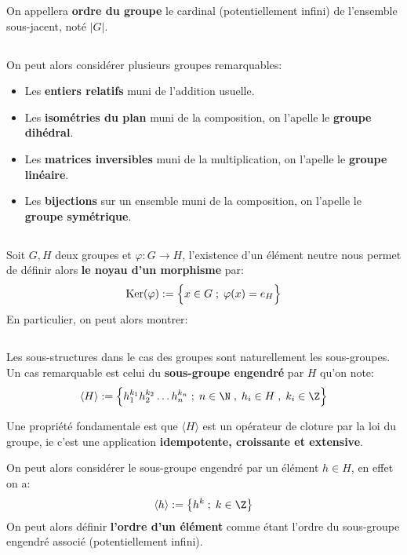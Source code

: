 On appellera \textbf{ordre du groupe} le cardinal (potentiellement infini) de l'ensemble sous-jacent, noté \(|G|\).
\subsection*{}
On peut alors considérer plusieurs groupes remarquables:
\begin{itemize}
   \item Les \textbf{entiers relatifs} muni de l'addition usuelle.
   \item Les \textbf{isométries du plan} muni de la composition, on l'apelle le \textbf{groupe dihédral}.  
   \item Les \textbf{matrices inversibles} muni de la multiplication, on l'apelle le \textbf{groupe linéaire}.
   \item Les \textbf{bijections} sur un ensemble muni de la composition, on l'apelle le \textbf{groupe symétrique}.
\end{itemize}
\subsection*{}
Soit \(G, H\) deux groupes et \(\varphi: G \rightarrow H\), l'existence d'un élément neutre nous permet de définir alors \textbf{le noyau d'un morphisme} par:
\[
   \text{Ker}(\varphi) := \Bigl\{ x \in G \; ; \; \varphi(x) = e_H \Bigl\}
\]
En particulier, on peut alors montrer:
\subsection*{}
Les sous-structures dans le cas des groupes sont naturellement les sous-groupes. Un cas remarquable est celui du \textbf{sous-groupe engendré} par \(H\) qu'on note:
\[ 
   \langle H \rangle := \Bigl\{ h_1^{k_1}h_2^{k_2} \ldots h_n^{k_n}\; ; \; n \in \N \; , \; h_i \in H \; , \; k_i \in \Z \Bigl\}
\]

Une propriété fondamentale est que \(\langle H \rangle\) est un opérateur de cloture par la loi du groupe, ie c'est une application \textbf{idempotente, croissante et extensive}.\<

On peut alors considérer le sous-groupe engendré par un élément \(h \in H\), en effet on a:
\[
   \langle h \rangle := \left\{ h^{k} \; ; \; k \in \Z \right\}
\]
On peut alors définir \textbf{l'ordre d'un élément} comme étant l'ordre du sous-groupe engendré associé (potentiellement infini).\<

